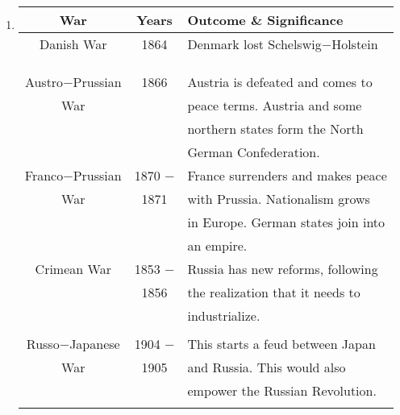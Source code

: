 \documentclass[12pt]{article}
\begin{document}
\begin{enumerate}
\item \begin{center} \begin{tabular}{|c|c|l|}
\hline
\textbf{War} & \textbf{Years} & \hspace{33pt} \textbf{Outcome \& Significance}\\
\hline
Danish War & 1864 & Denmark lost Schelswig$-$Holstein\\
 & & \\
 & & \\
 & & \\
\hline
 Austro$-$Prussian & 1866 & Austria is defeated and comes to \\
 War & & peace terms. Austria and some \\
 & & northern states form the North \\
 & & German Confederation. \\
\hline
 Franco$-$Prussian & 1870 $-$ & France surrenders and makes peace\\
 War & 1871 & with Prussia. Nationalism grows \\
 & & in Europe. German states join into \\
 & & an empire. \\
\hline
 Crimean War & 1853 $-$ & Russia has new reforms, following \\
 & 1856 & the realization that it needs to \\
 & & industrialize. \\
 & & \\
\hline
 Russo$-$Japanese & 1904 $-$ & This starts a feud between Japan \\
 War & 1905 & and Russia. This would also\\
 & & empower the Russian Revolution. \\
 & & \\
\hline

\end{tabular}
\end{center}

\end{enumerate}
\end{document}
